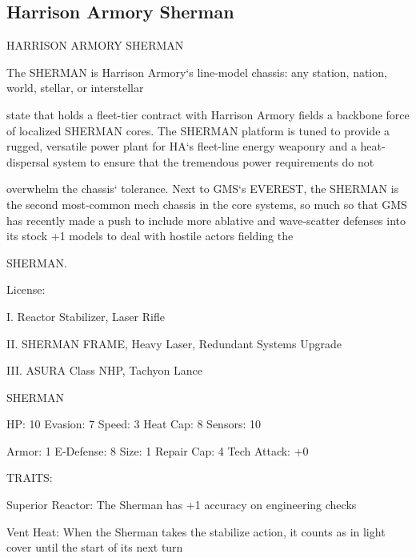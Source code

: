 \subsection{Harrison Armory Sherman}
                                                                                                                      


                              HARRISON ARMORY SHERMAN  

The SHERMAN is Harrison Armory‘s line-model chassis: any station, nation, world, stellar, or interstellar  

state that holds a fleet-tier contract with Harrison Armory fields a backbone force of localized SHERMAN  
cores. The SHERMAN platform is tuned to provide a rugged, versatile power plant for HA‘s fleet-line  
energy weaponry and a heat-dispersal system to ensure that the tremendous power requirements do not  

overwhelm the chassis‘ tolerance. Next to GMS‘s EVEREST, the SHERMAN is the second most-common  
mech chassis in the core systems, so much so that GMS has recently made a push to include more  
ablative and wave-scatter defenses into its stock +1 models to deal with hostile actors fielding the  

SHERMAN.   

                                                  License:
 
I. Reactor Stabilizer, Laser Rifle
 
II. SHERMAN FRAME, Heavy Laser, Redundant Systems Upgrade
 
III. ASURA Class NHP, Tachyon Lance
 

                                                SHERMAN 

 HP: 10         Evasion: 7                            Speed: 3           Heat Cap: 8       Sensors: 10 

 Armor: 1       E-Defense: 8                          Size: 1            Repair Cap: 4     Tech Attack:  
                                                                                           +0 

                                                  TRAITS: 

 Superior Reactor: The Sherman has +1 accuracy on engineering checks
 
 Vent Heat: When the Sherman takes the stabilize action, it counts as in light cover until the start of its  
 next turn 

